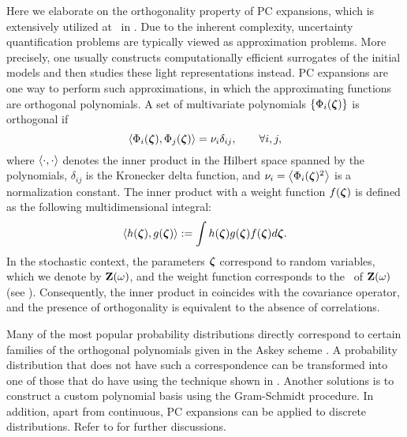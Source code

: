 Here we elaborate on the orthogonality property \cite{xiu2010} of PC expansions, which is extensively utilized at \ in .
Due to the inherent complexity, uncertainty quantification problems are typically viewed as approximation problems.
More precisely, one usually constructs computationally efficient surrogates of the initial models and then studies these light representations instead.
PC expansions \cite{xiu2010} are one way to perform such approximations, in which the approximating functions are orthogonal polynomials.
A set of multivariate polynomials $\{ \Phi_i(\boldsymbol{\zeta}) \}$ is orthogonal if
\begin{equation} \elabel{orthogonality}
  \oInner{\pcb_i(\vz)}{\pcb_j(\vz)} = \pcn_i \delta_{ij}, \qquad \forall i, j,
\end{equation}
where $\oInner{\cdot}{\cdot}$ denotes the inner product in the Hilbert space spanned by the polynomials, $\delta_{ij}$ is the Kronecker delta function, and $\pcn_i = \oInner{\pcb_i(\vz)^2}$ is a normalization constant.
The inner product with a weight function $f(\boldsymbol{\zeta})$ is defined as the following multidimensional integral:
\begin{equation} \elabel{inner-product}
  \oInner{h(\vz)}{g(\vz)} := \int h(\vz) g(\vz) \fPDF(\vz) d\vz.
\end{equation}
In the stochastic context, the parameters $\boldsymbol{\zeta}$ correspond to random variables, which we denote by $\mathbf{Z}(\omega)$, and the weight function corresponds to the \pdf\ of $\mathbf{Z}(\omega)$ (see ).
Consequently, the inner product in  coincides with the covariance operator, and the presence of orthogonality is equivalent to the absence of correlations.

Many of the most popular probability distributions directly correspond to certain families of the orthogonal polynomials given in the Askey scheme \cite{xiu2010}.
A probability distribution that does not have such a correspondence can be transformed into one of those that do have using the technique shown in .
Another solutions is to construct a custom polynomial basis using the Gram-Schmidt procedure.
In addition, apart from continuous, PC expansions can be applied to discrete distributions.
Refer to \cite{xiu2010} for further discussions.
